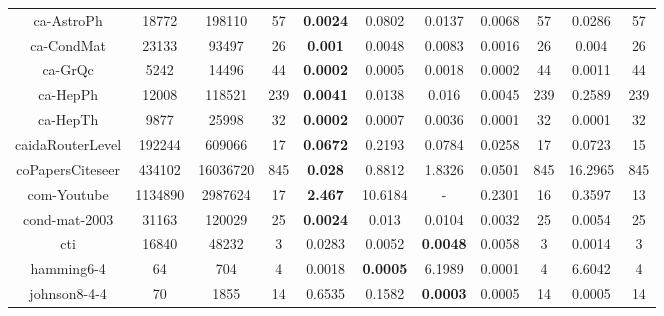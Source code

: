 \documentclass[12pt]{article}
\begin{document}
\begin{appendix}
\begin{table}[htb]
\begin{tabular}{|c|c|c|c|c|c|c|c|c|c|c|}
			ca-AstroPh       & 18772   & 198110   & 57       & \textbf{0.0024}  & 0.0802          & 0.0137          & 0.0068        & 57                 & 0.0286         & 57                  \\
			ca-CondMat       & 23133   & 93497    & 26       & \textbf{0.001}   & 0.0048          & 0.0083          & 0.0016        & 26                 & 0.004          & 26                  \\
			ca-GrQc          & 5242    & 14496    & 44       & \textbf{0.0002}  & 0.0005          & 0.0018          & 0.0002        & 44                 & 0.0011         & 44                  \\
			ca-HepPh         & 12008   & 118521   & 239      & \textbf{0.0041}  & 0.0138          & 0.016           & 0.0045        & 239                & 0.2589         & 239                 \\
			ca-HepTh         & 9877    & 25998    & 32       & \textbf{0.0002}  & 0.0007          & 0.0036          & 0.0001        & 32                 & 0.0001         & 32                  \\
			caidaRouterLevel & 192244  & 609066   & 17       & \textbf{0.0672}  & 0.2193          & 0.0784          & 0.0258        & 17                 & 0.0723         & 15                  \\
			coPapersCiteseer & 434102  & 16036720 & 845      & \textbf{0.028}   & 0.8812          & 1.8326          & 0.0501        & 845                & 16.2965        & 845                 \\
			com-Youtube      & 1134890 & 2987624  & 17       & \textbf{2.467}   & 10.6184         & -               & 0.2301        & 16                 & 0.3597         & 13                  \\
			cond-mat-2003    & 31163   & 120029   & 25       & \textbf{0.0024}  & 0.013           & 0.0104          & 0.0032        & 25                 & 0.0054         & 25                  \\
			cti              & 16840   & 48232    & 3        & 0.0283           & 0.0052          & \textbf{0.0048} & 0.0058        & 3                  & 0.0014         & 3                   \\
			hamming6-4       & 64      & 704      & 4        & 0.0018           & \textbf{0.0005} & 6.1989          & 0.0001        & 4                  & 6.6042         & 4                   \\
			johnson8-4-4     & 70      & 1855     & 14       & 0.6535           & 0.1582          & \textbf{0.0003} & 0.0005        & 14                 & 0.0005         & 14                  \\

\end{tabular}
\end{table}
\end{appendix}
\end{document}

